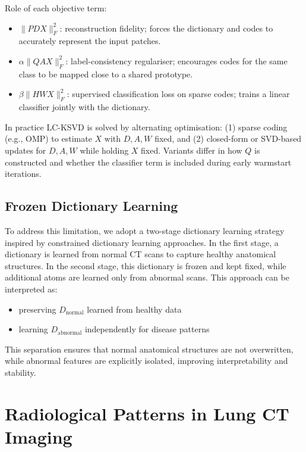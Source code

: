 Role of each objective term:
\begin{itemize}
    \item $\|P  D X\|_F^2$: reconstruction fidelity; forces the dictionary and codes to accurately represent the input patches.
    \item $\alpha \|Q  A X\|_F^2$: label-consistency regulariser; encourages codes for the same class to be mapped close to a shared prototype.
    \item $\beta \|H  W X\|_F^2$: supervised classification loss on sparse codes; trains a linear classifier jointly with the dictionary.
\end{itemize}

In practice LC-KSVD is solved by alternating optimisation: (1) sparse coding (e.g., OMP) to estimate $X$ with $D,A,W$ fixed, and (2) closed-form or SVD-based updates for $D,A,W$ while holding $X$ fixed. Variants differ in how $Q$ is constructed and whether the classifier term is included during early warmstart iterations.

\subsection{Frozen Dictionary Learning}

To address this limitation, we adopt a two-stage dictionary learning strategy inspired by constrained dictionary learning approaches. \cite{yankelevsky2016frozen}
In the first stage, a dictionary is learned from normal CT scans to capture healthy anatomical structures.
In the second stage, this dictionary is frozen and kept fixed, while additional atoms are learned only from abnormal scans.
This approach can be interpreted as:

\begin{itemize}
    \item preserving $D_{\text{normal}}$ learned from healthy data
    \item learning $D_{\text{abnormal}}$ independently for disease patterns
\end{itemize}

This separation ensures that normal anatomical structures are not overwritten, while abnormal features are explicitly isolated,
improving interpretability and stability.

% 

\section{Radiological Patterns in Lung CT Imaging}

